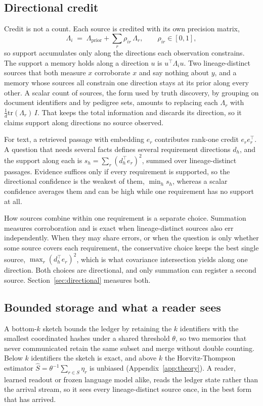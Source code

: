 \documentclass{article}
\begin{document}
\subsection{Directional credit}
\label{sec:conf}
Credit is not a count. Each source is credited with its own precision matrix,
\begin{equation}
\Lambda_i \;=\; \Lambda_{\text{prior}} + \sum_{r} \rho_{ir}\,\Lambda_r,
\qquad \rho_{ir}\in[0,1],
\label{eq:psd}
\end{equation}
so support accumulates only along the directions each observation constrains.
The support a memory holds along a direction $u$ is $u^\top\Lambda_i u$. Two
lineage-distinct sources that both measure $x$ corroborate $x$ and say nothing
about $y$, and a memory whose sources all constrain one direction stays at its
prior along every other. A scalar count of sources, the form used by truth
discovery, by grouping on document identifiers and by pedigree sets, amounts to
replacing each $\Lambda_r$ with $\tfrac{1}{d}\mathrm{tr}(\Lambda_r)\,I$. That
keeps the total information and discards its direction, so it claims support
along directions no source observed.

For text, a retrieved passage with embedding $e_r$ contributes rank-one credit
$e_r e_r^\top$. A question that needs several facts defines several requirement
directions $d_h$, and the support along each is $s_h=\sum_r (d_h^\top e_r)^2$,
summed over lineage-distinct passages. Evidence suffices only if every
requirement is supported, so the directional confidence is the weakest of them,
$\min_h s_h$, whereas a scalar confidence averages them and can be high while
one requirement has no support at all.

How sources combine within one requirement is a separate choice. Summation
measures corroboration and is exact when lineage-distinct sources also err
independently. When they may share errors, or when the question is only whether
some source covers each requirement, the conservative choice keeps the best
single source, $\max_r (d_h^\top e_r)^2$, which is what covariance intersection
\citep{julier1997ci} yields along one direction. Both choices are directional,
and only summation can register a second source.
Section~\ref{sec:directional} measures both.

\subsection{Bounded storage and what a reader sees}
\label{sec:sketch}
A bottom-$k$ sketch \citep{cohen2007bottomk} bounds the ledger by retaining the
$k$ identifiers with the smallest coordinated hashes under a shared threshold
$\theta$, so two memories that never communicated retain the same subset and
merge without double counting. Below $k$ identifiers the sketch is exact, and
above $k$ the Horvitz-Thompson estimator \citep{horvitz1952generalization}
$\hat{S}=\theta^{-1}\sum_{r\in S}\eta_r$ is unbiased
(Appendix~\ref{app:theory}). A reader, learned readout or frozen language model
alike, reads the ledger state rather than the arrival stream, so it sees every
lineage-distinct source once, in the best form that has arrived.
\end{document}
